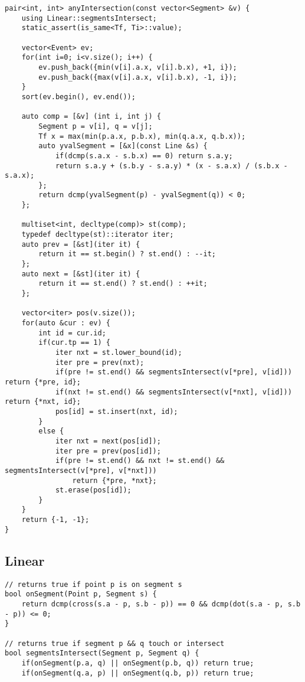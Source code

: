 \documentclass[FSZ,a4paper,onesided]{article}
\begin{document}
\begin{multicols*}{\COLS}
\begin{lstlisting}
pair<int, int> anyIntersection(const vector<Segment> &v) {
    using Linear::segmentsIntersect;
    static_assert(is_same<Tf, Ti>::value);

    vector<Event> ev;
    for(int i=0; i<v.size(); i++) {
        ev.push_back({min(v[i].a.x, v[i].b.x), +1, i});
        ev.push_back({max(v[i].a.x, v[i].b.x), -1, i});
    }
    sort(ev.begin(), ev.end());

    auto comp = [&v] (int i, int j) {
        Segment p = v[i], q = v[j];
        Tf x = max(min(p.a.x, p.b.x), min(q.a.x, q.b.x));
        auto yvalSegment = [&x](const Line &s) {
            if(dcmp(s.a.x - s.b.x) == 0) return s.a.y;
            return s.a.y + (s.b.y - s.a.y) * (x - s.a.x) / (s.b.x - s.a.x);
        };
        return dcmp(yvalSegment(p) - yvalSegment(q)) < 0;
    };

    multiset<int, decltype(comp)> st(comp);
    typedef decltype(st)::iterator iter;
    auto prev = [&st](iter it) {
        return it == st.begin() ? st.end() : --it;
    };
    auto next = [&st](iter it) {
        return it == st.end() ? st.end() : ++it;
    };

    vector<iter> pos(v.size());
    for(auto &cur : ev) {
        int id = cur.id;
        if(cur.tp == 1) {
            iter nxt = st.lower_bound(id);
            iter pre = prev(nxt);
            if(pre != st.end() && segmentsIntersect(v[*pre], v[id]))   return {*pre, id};
            if(nxt != st.end() && segmentsIntersect(v[*nxt], v[id]))   return {*nxt, id};
            pos[id] = st.insert(nxt, id);
        }
        else {
            iter nxt = next(pos[id]);
            iter pre = prev(pos[id]);
            if(pre != st.end() && nxt != st.end() && segmentsIntersect(v[*pre], v[*nxt]))
                return {*pre, *nxt};
            st.erase(pos[id]);
        }
    }
    return {-1, -1};
}\end{lstlisting}
\subsection{Linear}
\begin{lstlisting}
// returns true if point p is on segment s
bool onSegment(Point p, Segment s) {
    return dcmp(cross(s.a - p, s.b - p)) == 0 && dcmp(dot(s.a - p, s.b - p)) <= 0;
}

// returns true if segment p && q touch or intersect
bool segmentsIntersect(Segment p, Segment q) {
    if(onSegment(p.a, q) || onSegment(p.b, q)) return true;
    if(onSegment(q.a, p) || onSegment(q.b, p)) return true;


\end{lstlisting}
\end{multicols*}
\end{document}
